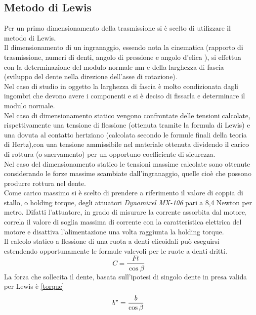 \documentclass[%
corpo=11pt,
twoside,
 stile=classica,
oldstyle,
greek,%
]{toptesi}
\begin{document}
	\subsection{Metodo di Lewis}
	Per un primo dimensionamento della trasmissione si è scelto di utilizzare il metodo di Lewis. \\
	Il dimensionamento di un ingranaggio, essendo nota la cinematica (rapporto di trasmissione, numeri di denti, angolo di pressione 
	 e angolo d’elica ), si effettua con la determinazione del modulo normale mn e della larghezza di fascia (sviluppo del dente nella
	direzione dell’asse di rotazione).\\
	 Nel caso di studio in oggetto la larghezza di fascia è molto condizionata dagli ingombri che devono avere i componenti e si è deciso di fissarla e determinare il modulo normale. \\
	Nel caso di dimensionamento statico vengono confrontate delle tensioni calcolate, rispettivamente una tensione di flessione (ottenuta tramite la formula di Lewis) e una dovuta al contatto hertziano (calcolata secondo le formule finali della teoria di Hertz),con una tensione ammissibile nel materiale ottenuta dividendo il carico di rottura (o
	snervamento) per un opportuno coefficiente di sicurezza. \\
	Nel caso del dimensionamento statico le tensioni massime calcolate sono ottenute considerando le forze massime scambiate dall’ingranaggio, quelle cioè che possono produrre rottura nel dente.\\
	Come carico massimo si è scelto di prendere a riferimento il valore di coppia di stallo, o holding torque, degli attuatori \textit{Dynamixel MX-106} pari a 8,4 Newton per metro. Difatti l'attuatore, in grado di misurare la corrente assorbita dal motore, correla il valore di soglia massima di corrente con la caratteristica elettrica del motore e disattiva l'alimentazione una volta raggiunta la holding torque. \\
	Il calcolo statico a flessione di una ruota a denti elicoidali può eseguirsi estendendo opportunamente le formule valevoli per le ruote a denti dritti.
	\begin{equation}\label{torque}
	C=\frac{Ft}{\cos\beta}
	\end{equation}
	La forza che sollecita il dente, basata sull'ipotesi di singolo dente in presa valida per Lewis è \ref{torque}
	\begin{equation}\label{larghezza}
	b"=\frac{b}{\cos\beta}
	\end{equation}	
\end{document}
